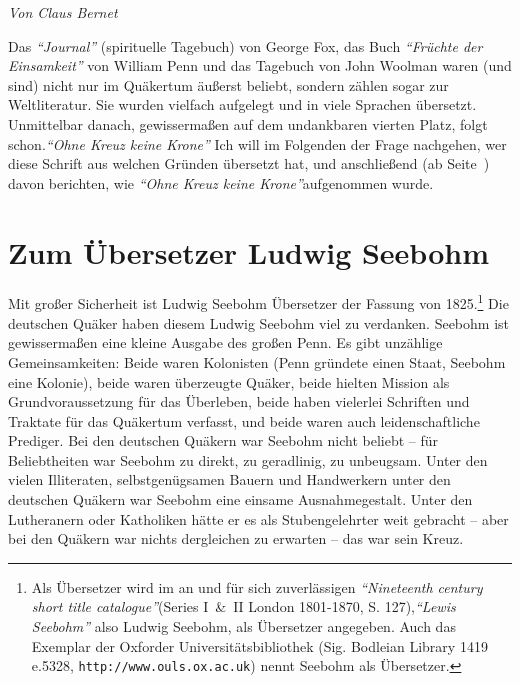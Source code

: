 
\begin{flushright}
\begin{footnotesize}
\textit{Von Claus Bernet}
\end{footnotesize}
\end{flushright}
\smallskip

Das \textit{"`Journal"'} (spirituelle Tagebuch) von George Fox, das Buch \textit{"`Früchte der Einsamkeit"'} von William
Penn und das Tagebuch von John
Woolman waren (und sind) nicht nur im Quäkertum
äußerst beliebt, sondern zählen sogar zur Weltliteratur.
Sie wurden vielfach aufgelegt und in viele Sprachen übersetzt. Unmittelbar
danach, gewissermaßen auf dem undankbaren vierten Platz, folgt schon.\textit{"`Ohne
Kreuz keine Krone"'} Ich will im Folgenden der Frage nachgehen, wer diese
Schrift
aus welchen Gründen übersetzt hat, und anschließend (ab
Seite~\pageref{ref:rezeptionsgeschichte}) davon berichten, wie \textit{"`Ohne Kreuz
keine Krone"'}aufgenommen wurde.

\section{Zum Übersetzer Ludwig Seebohm} \label{ref:l_seebohm}


Mit großer Sicherheit ist Ludwig Seebohm
Übersetzer der Fassung von 1825.\footnote{Als Übersetzer wird im an und für sich
zuverlässigen \textit{"`Nineteenth century
short title catalogue"'}(Series I~\&~II London 1801-1870, S. 127),\textit{"`Lewis
Seebohm"'} also Ludwig Seebohm, als Übersetzer angegeben. Auch das Exemplar der
Oxforder Universitätsbibliothek (Sig. Bodleian Library 1419 e.5328,
\texttt{http://www.ouls.ox.ac.uk}) nennt Seebohm als Übersetzer.}
Die deutschen Quäker haben diesem Ludwig Seebohm viel zu
verdanken. Seebohm ist gewissermaßen eine kleine Ausgabe des großen Penn. Es
gibt unzählige Gemeinsamkeiten: Beide waren Kolonisten (Penn gründete einen
Staat, Seebohm eine Kolonie), beide waren überzeugte Quäker, beide hielten
Mission als Grundvoraussetzung für das Überleben, beide haben
vielerlei Schriften und Traktate für das Quäkertum verfasst, und beide waren
auch leidenschaftliche Prediger.
Bei den deutschen Quäkern war Seebohm nicht beliebt -- für Beliebtheiten war
Seebohm zu direkt, zu geradlinig, zu unbeugsam. Unter den vielen Illiteraten,
selbstgenügsamen Bauern und
Handwerkern unter den deutschen Quäkern war Seebohm
eine einsame Ausnahmegestalt. Unter den Lutheranern
oder Katholiken hätte er es als Stubengelehrter weit
gebracht -- aber bei den Quäkern war nichts dergleichen zu erwarten -- das war
sein Kreuz.

